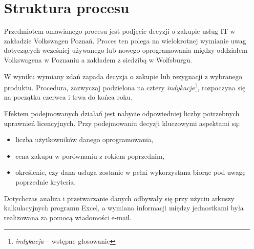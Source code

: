 \section{Struktura procesu}
Przedmiotem omawianego procesu jest podjęcie decyzji o zakupie usług IT w zakładzie Volkswagen Poznań. Proces ten polega na wielokrotnej wymianie uwag dotyczących wcześniej używanego lub nowego oprogramowania między oddziałem Volkswagena w Poznaniu a zakładem z siedzibą w Wolfsburgu.

W wyniku wymiany zdań zapada decyzja o zakupie lub rezygnacji z wybranego produktu. Procedura, zazwyczaj podzielona na cztery \emph{indykacje}\footnote{\emph{indykacja} – wstępne głosowanie}, rozpoczyna się na początku czerwca i trwa do końca roku.

Efektem podejmowanych działań jest nabycie odpowiedniej liczby potrzebnych uprawnień licencyjnych. Przy
podejmowaniu decyzji kluczowymi aspektami są:
\begin{itemize}
    \item liczba użytkowników danego oprogramowania,
    \item cena zakupu w porównaniu z rokiem poprzednim,
    \item określenie, czy dana usługa zostanie w pełni wykorzystana biorąc pod uwagę poprzednie kryteria.
\end{itemize}
Dotychczas analiza i przetwarzanie danych odbywały się przy użyciu arkuszy kalkulacyjnych programu Excel, a wymiana informacji między jednostkami była realizowana za pomocą wiadomości e-mail.